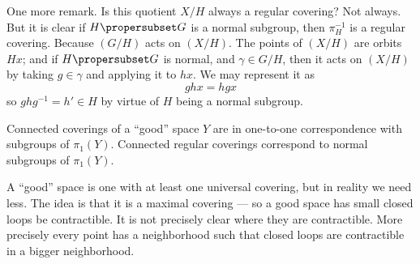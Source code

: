 One more remark. Is this quotient $X/H$ always a regular
covering? Not always. But it is clear if $H\propersubset G$ is a
normal subgroup, then $\pi^{-1}_{H}$ is a regular
covering. Because $(G/H)$ acts on $(X/H)$. The points of $(X/H)$
are orbits $Hx$; and if $H\propersubset G$ is normal, and
$\gamma\in G/H$, then it acts on $(X/H)$ by taking $g\in\gamma$
and applying it to $hx$. We may represent it as
\begin{equation}
ghx=hgx
\end{equation}
so $ghg^{-1}=h'\in H$ by virtue of $H$ being a normal subgroup.

\begin{thm}
Connected coverings of a ``good'' space $Y$ are in one-to-one
correspondence with subgroups of $\pi_{1}(Y)$. Connected regular
coverings correspond to normal subgroups of $\pi_{1}(Y)$.
\end{thm}

A ``good'' space is one with at least one universal covering, but
in reality we need less. The idea is that it is a maximal
covering --- so a good space has small closed loops be
contractible. It is not precisely clear where they are
contractible. More precisely every point has a neighborhood such
that closed loops are contractible in a bigger neighborhood.

